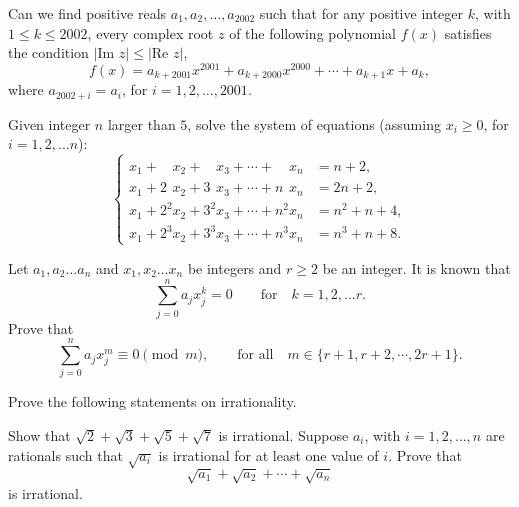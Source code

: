 \begin{question}[name={2003 China TST}]
    Can we find positive reals $a_1, a_2, \dots, a_{2002}$ such that for any positive integer $k$, with $1 \leq k \leq 2002$, every complex root $z$ of the following polynomial $f(x)$ satisfies the condition $|\text{Im } z| \leq |\text{Re } z|$, 
    \[f(x)=a_{k+2001}x^{2001}+a_{k+2000}x^{2000}+ \cdots + a_{k+1}x+a_k,\]  where $a_{2002+i}=a_i$, for $i=1,2, \dots, 2001$.
\end{question}




\begin{question}[name={2004 China TST}]
    Given integer $ n$ larger than $ 5$, solve the system of equations (assuming $x_i \geq 0$, for $ i=1,2, \dots n$):
    \[ \begin{cases} \displaystyle x_1+ \phantom{2^2} x_2+ \phantom{3^2} x_3 + \cdots + \phantom{n^2} x_n &= n+2, \\ x_1 + 2\phantom{^2}x_2 + 3\phantom{^2}x_3 + \cdots + n\phantom{^2}x_n &= 2n+2, \\ x_1 + 2^2x_2 + 3^2 x_3 + \cdots + n^2x_n &= n^2 + n +4, \\ x_1+ 2^3x_2 + 3^3x_3+ \cdots + n^3x_n &= n^3 + n + 8. \end{cases} \]
\end{question}




\begin{question}[name={2005 China TST}]
    Let $a_1,a_2 \dots a_n$ and $x_1, x_2 \dots x_n$ be integers and $r\geq 2$ be an integer. It is known that \[\sum_{j=0}^{n} a_j x_j^k =0 \qquad \text{for} \quad k=1,2, \dots r.\]
    Prove that
    \[\sum_{j=0}^{n} a_j x_j^m \equiv 0 \pmod m, \qquad \text{for all}\quad  m \in \{ r+1, r+2, \cdots, 2r+1 \}.\]
\end{question}


\begin{question}
    Prove the following statements on irrationality.
    \begin{tasks}
        \task Show that $\sqrt{2} + \sqrt{3} + \sqrt{5} + \sqrt{7}$ is irrational.
        \task Suppose $a_i$, with $i=1,2, \dots ,n$ are rationals such that $\sqrt{a_i}$ is irrational for at least one value of $i$. Prove that \[\sqrt{a_1} + \sqrt{a_2} + \cdots + \sqrt{a_n}\] is irrational.
    \end{tasks}
\end{question}



